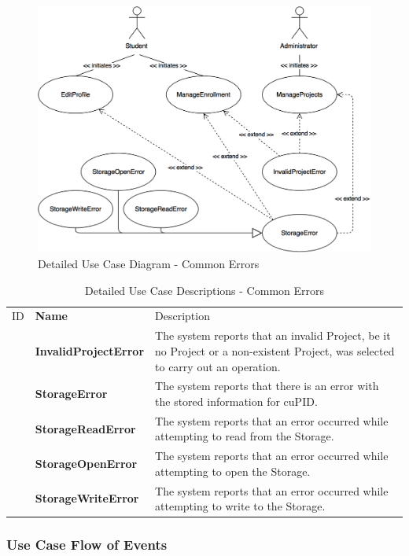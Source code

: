 \documentclass[12pt,letterpaper]{article}
\begin{document}
\begin{figure}[H]
	\centering{}
	\includegraphics[scale=0.3]{imgs/detailed-common-error-use-case-diagram.png}
	\caption{Detailed Use Case Diagram - Common Errors}
\end{figure}

\begin{table}[H]
	\caption{Detailed Use Case Descriptions - Common Errors}
	\vspace{1em}
	\begin{tabu} to 
	    \tableheader{}ID & Name & Description\\
   		\invalidprojecterror{} & InvalidProjectError & The system reports that an invalid Project, be it no Project or a non-existent Project, was selected to carry out an operation.\\
		\storageerror{} & StorageError &  The system reports that there is an error with the stored information for cuPID.\\
		\storagereaderror{} & StorageReadError & The system reports that an error occurred while attempting to read from the Storage.\\
		\storageopenerror{} & StorageOpenError & The system reports that an error occurred while attempting to open the Storage.\\
		\storagewriteerror{} & StorageWriteError & The system reports that an error occurred while attempting to write to the Storage.\\
	\end{tabu}
\end{table}

\subsubsection*{Use Case Flow of Events}
\end{document}
